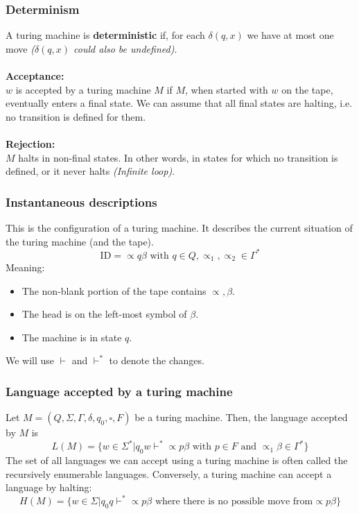 \documentclass[11pt]{article}
\begin{document}
\subsubsection{Determinism}
A turing machine is \textbf{deterministic} if, for each $\delta(q,x)$ we have at most one move \textit{($\delta(q,x)$ could also be undefined)}.
\\\\
\textbf{Acceptance:}\\
$w$ is accepted by a turing machine $M$ if $M$, when started with $w$ on the tape, eventually enters a final state. We can assume that all final states are halting, i.e. no transition is defined for them.
\\\\
\textbf{Rejection:}\\
$M$ halts in non-final states. In other words, in states for which no transition is defined, or it never halts \textit{(Infinite loop)}.

\subsubsection{Instantaneous descriptions}
This is the configuration of a turing machine. It describes the current situation of the turing machine (and the tape).
$$
\text{ID}=\propto q\beta\text{ with }q\in Q,\propto_1,\propto_2\in\Gamma^{\ast}
$$
Meaning:
\begin{itemize}
    \item The non-blank portion of the tape contains $\propto,\beta$.
    \item The head is on the left-most symbol of $\beta$.
    \item The machine is in state $q$.
\end{itemize}
We will use $\vdash$ and $\vdash^{\ast}$ to denote the changes.

\subsubsection{Language accepted by a turing machine}
Let $M=(Q,\Sigma,\Gamma,\delta,q_0,\square,F)$ be a turing machine. Then, the language accepted by $M$ is
$$
L(M)=\{w\in\Sigma^{\ast}|q_0w\vdash^{\ast}\propto p\beta\text{ with }p\in F\text{ and }\propto_1\beta\in\Gamma^{\ast}\}
$$
The set of all languages we can accept using a turing machine is often called the recursively enumerable languages.
Conversely, a turing machine can accept a language by halting:
$$
H(M)=\{w\in\Sigma|q_0q\vdash^{\ast}\propto p\beta\text{ where there is no possible move from}\propto p\beta\}
$$
\end{document}

